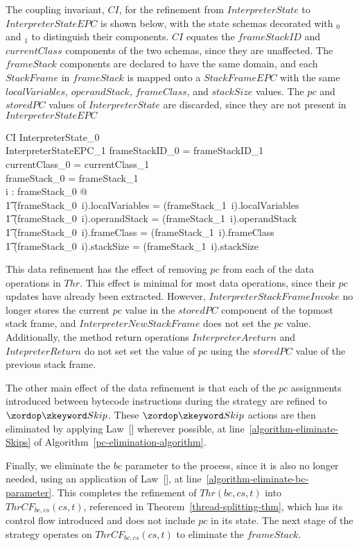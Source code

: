 The coupling invariant, $CI$, for the refinement from
$InterpreterState$ to $InterpreterStateEPC$ is shown below, with the
state schemas decorated with ${}_0$ and ${}_1$ to distinguish their
components.
$CI$ equates the $frameStackID$ and $currentClass$ components of the
two schemas, since they are unaffected.
The $frameStack$ components are declared to have the same domain, and
each $StackFrame$ in $frameStack$ is mapped onto a $StackFrameEPC$
with the same $localVariables$, $operandStack$, $frameClass$, and
$stackSize$ values.
The $pc$ and $storedPC$ values of $InterpreterState$ are discarded,
since they are not present in $InterpreterStateEPC$
\begin{schema}{CI}
  InterpreterState_0 \\
  InterpreterStateEPC_1
\where
  frameStackID_0 = frameStackID_1 \\
  currentClass_0 = currentClass_1 \\
  \dom frameStack_0 = \dom frameStack_1 \\
  \forall i : \dom frameStack_0 @ \\
  \t1 (frameStack_0~i).localVariables = (frameStack_1~i).localVariables \land \\
  \t1 (frameStack_0~i).operandStack = (frameStack_1~i).operandStack \land \\
  \t1 (frameStack_0~i).frameClass = (frameStack_1~i).frameClass \land \\
  \t1 (frameStack_0~i).stackSize = (frameStack_1~i).stackSize
\end{schema}

This data refinement has the effect of removing $pc$ from each of the
data operations in $Thr$.
This effect is minimal for most data operations, since their $pc$
updates have already been extracted. 
However, $InterpreterStackFrameInvoke$ no longer stores the current
$pc$ value in the $storedPC$ component of the topmost stack frame, and
$InterpreterNewStackFrame$ does not set the $pc$ value.
Additionally, the method return operations $InterpreterAreturn$ and
$IntepreterReturn$ do not set set the value of $pc$ using the
$storedPC$ value of the previous stack frame.

The other main effect of the data refinement is that each of the $pc$
assignments introduced between bytecode instructions during the
strategy are refined to $\Skip$.
These $\Skip$ actions are then eliminated by applying
Law~[] wherever possible, at
line~\ref{algorithm-eliminate-Skips} of
Algorithm~\ref{pc-elimination-algorithm}.

Finally, we eliminate the $bc$ parameter to the process, since it is
also no longer needed, using an application of
Law~[], at
line~\ref{algorithm-eliminate-bc-parameter}.
This completes the refinement of $Thr(bc,cs,t)$ into
$ThrCF_{bc,cs}(cs,t)$, referenced in
Theorem~\ref{thread-splitting-thm}, which has its control flow
introduced and does not include $pc$ in its state.
The next stage of the strategy operates on $ThrCF_{bc,cs}(cs,t)$ to
eliminate the $frameStack$.
